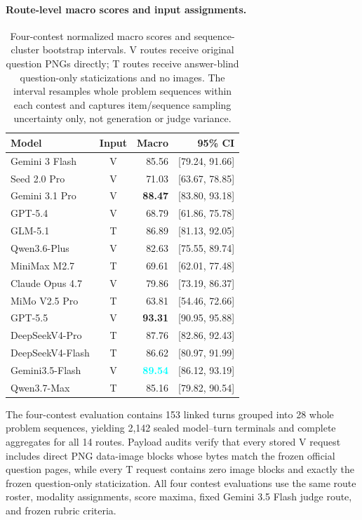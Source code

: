\documentclass[11pt]{article}
\newcommand{\RankOne}[1]{\textbf{\textcolor{yellow!50!orange}{#1}}}
\newcommand{\RankTwo}[1]{\textbf{\textcolor{cyan}{#1}}}
\newcommand{\RankThree}[1]{\textbf{\textcolor{lime!80!black}{#1}}}
\newcounter{savedtablecounter}
\begin{document}
\paragraph{Route-level macro scores and input assignments.}
\setcounter{savedtablecounter}{\value{table}}
\setcounter{table}{6}
\begin{table}[t]
\centering
\scriptsize
\setlength{\tabcolsep}{3.2pt}
\renewcommand{\arraystretch}{1.02}
\begin{tabular}{l c r r}
\toprule
\textbf{Model} & \textbf{Input} & \textbf{Macro} & \textbf{95\% CI} \\
\midrule
Gemini 3 Flash & V & 85.56 & [79.24, 91.66] \\
Seed 2.0 Pro & V & 71.03 & [63.67, 78.85] \\
Gemini 3.1 Pro & V & \RankThree{88.47} & [83.80, 93.18] \\
GPT-5.4 & V & 68.79 & [61.86, 75.78] \\
GLM-5.1 & T & 86.89 & [81.13, 92.05] \\
Qwen3.6-Plus & V & 82.63 & [75.55, 89.74] \\
MiniMax M2.7 & T & 69.61 & [62.01, 77.48] \\
Claude Opus 4.7 & V & 79.86 & [73.19, 86.37] \\
MiMo V2.5 Pro & T & 63.81 & [54.46, 72.66] \\
GPT-5.5 & V & \RankOne{93.31} & [90.95, 95.88] \\
DeepSeekV4-Pro & T & 87.76 & [82.86, 92.43] \\
DeepSeekV4-Flash & T & 86.62 & [80.97, 91.99] \\
Gemini3.5-Flash & V & \RankTwo{89.54} & [86.12, 93.19] \\
Qwen3.7-Max & T & 85.16 & [79.82, 90.54] \\
\bottomrule
\end{tabular}
\caption{Four-contest normalized macro scores and sequence-cluster bootstrap intervals. V routes receive original question PNGs directly; T routes receive answer-blind question-only staticizations and no images. The interval resamples whole problem sequences within each contest and captures item/sequence sampling uncertainty only, not generation or judge variance.}
\label{tab:fresh-2026-ci}
\end{table}
\setcounter{table}{\value{savedtablecounter}}

The four-contest evaluation contains 153 linked turns grouped into 28 whole problem sequences, yielding 2,142 sealed model--turn terminals and complete aggregates for all 14 routes. Payload audits verify that every stored V request includes direct PNG data-image blocks whose bytes match the frozen official question pages, while every T request contains zero image blocks and exactly the frozen question-only staticization. All four contest evaluations use the same route roster, modality assignments, score maxima, fixed Gemini 3.5 Flash judge route, and frozen rubric criteria.
\end{document}
